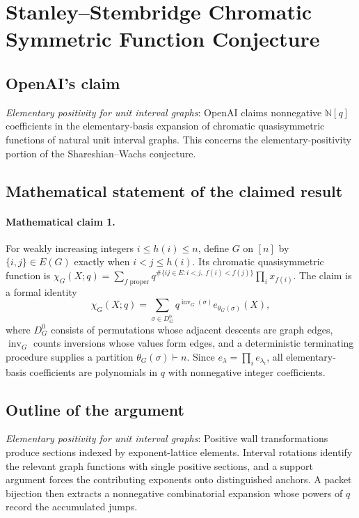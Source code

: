 \documentclass[11pt]{article}
\begin{document}
\section*{Stanley–Stembridge Chromatic Symmetric Function Conjecture}

\subsection{OpenAI's claim}
\textit{Elementary positivity for unit interval graphs}: OpenAI claims nonnegative $\mathbb N[q]$ coefficients in the elementary-basis expansion of chromatic quasisymmetric functions of natural unit interval graphs. This concerns the elementary-positivity portion of the Shareshian--Wachs conjecture.

\subsection{Mathematical statement of the claimed result}
\paragraph{Mathematical claim 1.} For weakly increasing integers $i\le h(i)\le n$, define $G$ on $[n]$ by $\{i,j\}\in E(G)$ exactly when $i<j\le h(i)$. Its chromatic quasisymmetric function is $\chi_G(X;q)=\sum_{f\text{ proper}}q^{\#\{ij\in E:i<j,\ f(i)<f(j)\}}\prod_i x_{f(i)}$. The claim is a formal identity \[\chi_G(X;q)=\sum_{\sigma\in D_G^0}q^{\operatorname{inv}_G(\sigma)}e_{\theta_G(\sigma)}(X),\] where $D_G^0$ consists of permutations whose adjacent descents are graph edges, $\operatorname{inv}_G$ counts inversions whose values form edges, and a deterministic terminating procedure supplies a partition $\theta_G(\sigma)\vdash n$. Since $e_\lambda=\prod_i e_{\lambda_i}$, all elementary-basis coefficients are polynomials in $q$ with nonnegative integer coefficients.

\subsection{Outline of the argument}
\textit{Elementary positivity for unit interval graphs}: Positive wall transformations produce sections indexed by exponent-lattice elements. Interval rotations identify the relevant graph functions with single positive sections, and a support argument forces the contributing exponents onto distinguished anchors. A packet bijection then extracts a nonnegative combinatorial expansion whose powers of $q$ record the accumulated jumps.
\end{document}
